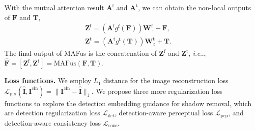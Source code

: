 \documentclass[10pt,twocolumn,letterpaper]{article}
\makeatletter
\DeclareRobustCommand\onedot{\futurelet\@let@token\@onedot}
\def\@onedot{\ifx\@let@token.\else.\null\fi\xspace}
\def\ie{\emph{i.e}\onedot} \def\Ie{\emph{I.e}\onedot}
\renewcommand{\paragraph}[1]{\vspace{1.25mm}\noindent\textbf{#1}}
\makeatother
\begin{document}
With the mutual attention result $\mathbf{A}^\text{f}$ and $\mathbf{A}^\text{t}$, we can obtain the non-local outputs of $\mathbf{F}$ and $\mathbf{T}$,
%
\begin{align}\label{eq:nonlocal-4}
\mathbf{Z}^\text{f}=(\mathbf{A}^\text{f}g^\text{f}(\mathbf{F}))\mathbf{W}_z^\text{f}+\mathbf{F},  \\ 
\mathbf{Z}^\text{t}=(\mathbf{A}^\text{t}g^\text{t}(\mathbf{T}))\mathbf{W}_z^\text{t}+\mathbf{T}.
\end{align}
The final output of MAFus is the concatenation of $\mathbf{Z}^\text{f}$ and $\mathbf{Z}^\text{t}$, \ie, $\hat{\mathbf{F}}=[\mathbf{Z}^\text{f}, \mathbf{Z}^\text{t}]=\text{MAFus}(\mathbf{F},\mathbf{T})$.
%

\paragraph{Loss functions.}
We employ $L_{1}$ distance for the image reconstruction loss $\mathcal{L}_\mathrm{pix}(\hat{\mathbf{I}}, {\mathbf{I}}^\text{cln}) =\|{\mathbf{I}}^\text{cln}-\hat{\mathbf{I}}\|_{1}$. We propose three more regularization loss functions to explore the detection embedding guidance for shadow removal, which are detection regularization loss $\mathcal{L}_\mathrm{det}$, detection-aware perceptual loss $\mathcal{L}_\mathrm{pep}$, and detection-aware consistency loss $\mathcal{L}_\mathrm{cons}$.
\end{document}
